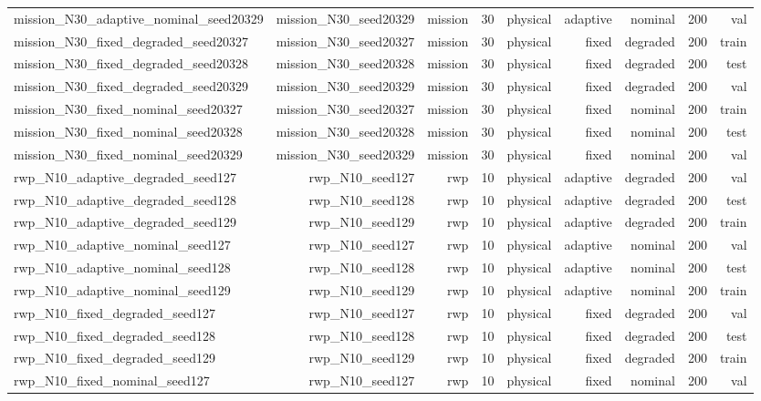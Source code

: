 \begin{tabular}{lrrrrrrrr}
mission\_N30\_adaptive\_nominal\_seed20329 & mission\_N30\_seed20329 & mission & 30 & physical & adaptive & nominal & 200 & val \\
mission\_N30\_fixed\_degraded\_seed20327 & mission\_N30\_seed20327 & mission & 30 & physical & fixed & degraded & 200 & train \\
mission\_N30\_fixed\_degraded\_seed20328 & mission\_N30\_seed20328 & mission & 30 & physical & fixed & degraded & 200 & test \\
mission\_N30\_fixed\_degraded\_seed20329 & mission\_N30\_seed20329 & mission & 30 & physical & fixed & degraded & 200 & val \\
mission\_N30\_fixed\_nominal\_seed20327 & mission\_N30\_seed20327 & mission & 30 & physical & fixed & nominal & 200 & train \\
mission\_N30\_fixed\_nominal\_seed20328 & mission\_N30\_seed20328 & mission & 30 & physical & fixed & nominal & 200 & test \\
mission\_N30\_fixed\_nominal\_seed20329 & mission\_N30\_seed20329 & mission & 30 & physical & fixed & nominal & 200 & val \\
rwp\_N10\_adaptive\_degraded\_seed127 & rwp\_N10\_seed127 & rwp & 10 & physical & adaptive & degraded & 200 & val \\
rwp\_N10\_adaptive\_degraded\_seed128 & rwp\_N10\_seed128 & rwp & 10 & physical & adaptive & degraded & 200 & test \\
rwp\_N10\_adaptive\_degraded\_seed129 & rwp\_N10\_seed129 & rwp & 10 & physical & adaptive & degraded & 200 & train \\
rwp\_N10\_adaptive\_nominal\_seed127 & rwp\_N10\_seed127 & rwp & 10 & physical & adaptive & nominal & 200 & val \\
rwp\_N10\_adaptive\_nominal\_seed128 & rwp\_N10\_seed128 & rwp & 10 & physical & adaptive & nominal & 200 & test \\
rwp\_N10\_adaptive\_nominal\_seed129 & rwp\_N10\_seed129 & rwp & 10 & physical & adaptive & nominal & 200 & train \\
rwp\_N10\_fixed\_degraded\_seed127 & rwp\_N10\_seed127 & rwp & 10 & physical & fixed & degraded & 200 & val \\
rwp\_N10\_fixed\_degraded\_seed128 & rwp\_N10\_seed128 & rwp & 10 & physical & fixed & degraded & 200 & test \\
rwp\_N10\_fixed\_degraded\_seed129 & rwp\_N10\_seed129 & rwp & 10 & physical & fixed & degraded & 200 & train \\
rwp\_N10\_fixed\_nominal\_seed127 & rwp\_N10\_seed127 & rwp & 10 & physical & fixed & nominal & 200 & val \\

\end{tabular}
